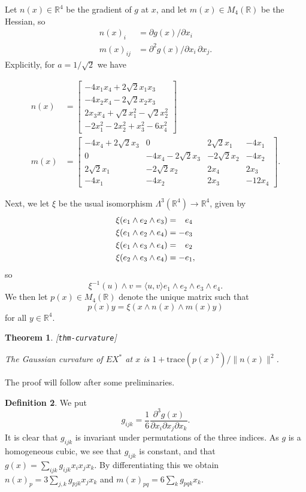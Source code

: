 \documentclass[reqno]{amsart}
\newcommand{\lbl}[1]{\label{#1}\textup{[\texttt{#1}]}\par}
\newcommand{\lbl}{\label}
\newcommand{\Lm}        {\Lambda}
\newcommand{\R}         {{\mathbb{R}}}
\newcommand{\ip}[1]     {\langle #1\rangle}
\newcommand{\rt}        {\sqrt{2}}
\newcommand{\pp}        {\hphantom{+}}
\renewcommand{\:}{\colon}
\newtheorem{theorem}{Theorem}[subsection]
\theoremstyle{definition}
\newtheorem{definition}[theorem]{Definition}
\begin{document}
Let $n(x)\in\R^4$ be the gradient of $g$ at $x$, and let
$m(x)\in M_4(\R)$ be the Hessian, so
\begin{align*}
 n(x)_i &= \partial g(x)/\partial x_i \\
 m(x)_{ij} &= \partial^2 g(x)/\partial x_i\,\partial x_j.
\end{align*}
Explicitly, for $a=1/\rt$ we have

\begin{align*}
 n(x) &= \left[\begin{array}{c}
           -4 x_1 x_4+2\rt x_1 x_3 \\
           -4 x_2 x_4-2\rt x_2 x_3 \\
           2 x_3 x_4+\rt x_1^2-\rt x_2^2 \\
           -2 x_1^2-2 x_2^2+x_3^2-6 x_4^2
         \end{array}\right] \\
 m(x) &=  \left[ \begin {array}{cccc}
            -4 x_4+2\rt x_3&0&2\rt x_1&-4 x_1 \\
            0&-4 x_4-2\rt x_3&-2\rt x_2&-4 x_2\\
            2\rt x_1&-2\rt x_2&2 x_4&2 x_3 \\
            -4 x_1&-4 x_2&2 x_3&-12 x_4
          \end {array} \right] .
\end{align*}

Next, we let $\xi$ be the usual isomorphism $\Lm^3(\R^4)\to\R^4$,
given by
\begin{align*}
 \xi(e_1\wedge e_2\wedge e_3) &= \pp e_4 \\
 \xi(e_1\wedge e_2\wedge e_4) &=    -e_3 \\
 \xi(e_1\wedge e_3\wedge e_4) &= \pp e_2 \\
 \xi(e_2\wedge e_3\wedge e_4) &=    -e_1,
\end{align*}
so
\[ \xi^{-1}(u)\wedge v =
     \ip{u,v} e_1\wedge e_2\wedge e_3\wedge e_4.
\]
We then let $p(x)\in M_4(\R)$ denote the unique matrix such that
\[ p(x)y = \xi(x\wedge n(x)\wedge m(x)y) \]
for all $y\in\R^4$.

\begin{theorem}\lbl{thm-curvature}
 The Gaussian curvature of $EX^*$ at $x$ is
 $1+\text{trace}(p(x)^2)/\|n(x)\|^2$.
\end{theorem}

The proof will follow after some preliminaries.

\begin{definition}
 We put
 \[ g_{ijk} = \frac{1}{6}
     \frac{\partial^3g(x)}{\partial x_i\partial x_j\partial x_k}.
 \]
 It is clear that $g_{ijk}$ is invariant under permutations of the
 three indices.  As $g$ is a homogeneous cubic, we see that $g_{ijk}$
 is constant, and that $g(x)=\sum_{ijk}g_{ijk}x_ix_jx_k$.  By
 differentiating this we obtain $n(x)_p=3\sum_{j,k}g_{pjk}x_jx_k$ and
 $m(x)_{pq}=6\sum_kg_{pqk}x_k$.
\end{definition}
\end{document}
